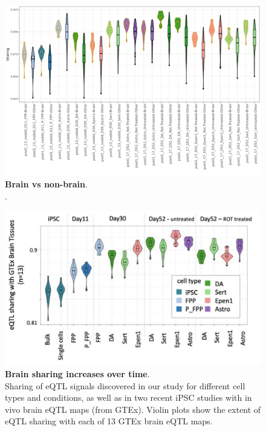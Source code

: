 \begin{figure}[h]
\centering
\includegraphics[width=16cm]{Chapter5/Fig/neuroseq_gtex_brain_nonbrain_boxplots.png}
\caption[Brain vs non-brain]{\textbf{Brain vs non-brain}.\\
.}
\label{fig:neuroseq_and_gtex_brain_specificity}
\end{figure}

\begin{figure}[h]
\centering
\includegraphics[width=16cm]{Chapter5/Fig/neuroseq_gtex_brain_boxplots.png}
\caption[Brain sharing increase]{\textbf{Brain sharing increases over time}.\\
Sharing of eQTL signals discovered in our study for different cell types and conditions, as well as in two recent iPSC studies \cite{cuomo2020single, bonder2019systematic} with in vivo brain eQTL maps (from GTEx). 
Violin plots show the extent of eQTL sharing with each of 13 GTEx brain eQTL maps.}
\label{fig:neuroseq_and_gtex_brain_sharing}
\end{figure}

